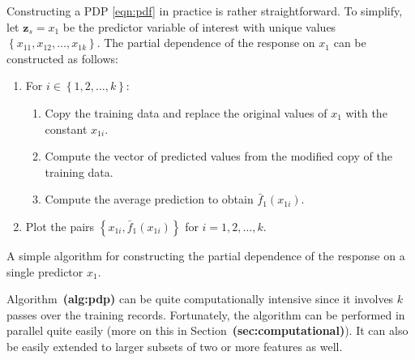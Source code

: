 \documentclass{article}
\def\ref#1{\textbf{(#1)}}
\begin{document}
Constructing a PDP \eqref{eqn:pdf} in practice is rather straightforward. To simplify, let $\boldsymbol{z}_s = x_1$ be the predictor variable of interest with unique values $\left\{x_{11}, x_{12}, \dots, x_{1k}\right\}$. The partial dependence of the response on $x_1$ can be constructed as follows:

\begin{algorithm}
\begin{enumerate}
  \item For $i \in \left\{1, 2, \dots, k\right\}$:
  \begin{enumerate}
    \item Copy the training data and replace the original values of $x_1$ with the constant $x_{1i}$.
    \item Compute the vector of predicted values from the modified copy of the training data.
    \item Compute the average prediction to obtain $\bar{f}_1\left(x_{1i}\right)$.
  \end{enumerate}
  \item Plot the pairs $\left\{x_{1i}, \bar{f}_1\left(x_{1i}\right)\right\}$ for $i = 1, 2, \dotsc, k$.
\end{enumerate}
\caption{A simple algorithm for constructing the partial dependence of the response on a single predictor $x_1$. \label{alg:pdp}}
\end{algorithm}
Algorithm~\ref{alg:pdp} can be quite computationally intensive since it involves $k$ passes over the training records. Fortunately, the algorithm can be performed in parallel quite easily (more on this in Section~\ref{sec:computational}). It can also be easily extended to larger subsets of two or more features as well.
\end{document}
